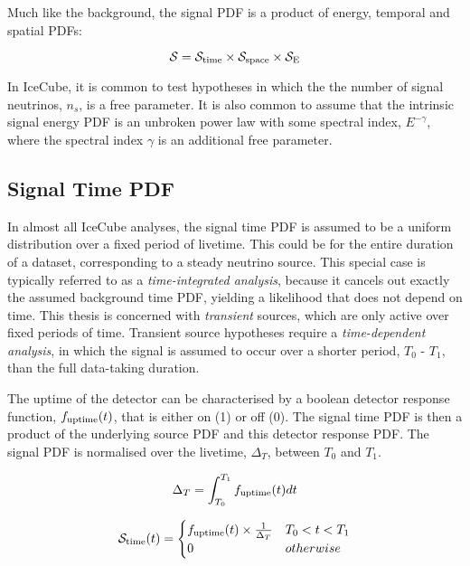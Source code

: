 Much like the background, the signal PDF is a product of energy, temporal and spatial PDFs:

\begin{equation}
\mathcal{S} =  \mathcal{S}_{\textup{time}} \times  \mathcal{S}_{\textup{space}} \times\mathcal{S}_{\textup{E}}
\end{equation}

In IceCube, it is common to test hypotheses in which the the number of signal neutrinos, $n_{s}$, is a free parameter. It is also common to assume that the intrinsic signal energy PDF is an unbroken power law with some spectral index, $E^{-\gamma}$, where the spectral index $\gamma$ is an additional free parameter. 

\subsection*{Signal Time PDF}

In almost all IceCube analyses, the signal time PDF is assumed to be a uniform distribution over a fixed period of livetime. This could be for the entire duration of a dataset, corresponding to a steady neutrino source. This special case is typically referred to as a \emph{time-integrated analysis}, because it cancels out exactly the assumed background time PDF, yielding a likelihood that does not depend on time. This thesis is concerned with \emph{transient} sources, which are only active over fixed periods of time.  Transient source hypotheses require a \emph{time-dependent analysis}, in which the signal is assumed to occur over a shorter period, $T_{0}$ - $T_{1}$, than the full data-taking duration.

The uptime of the detector can be characterised by a boolean detector response function, $f_{\textup{uptime}}(t)$, that is either on (1) or off (0). The signal time PDF is then a product of the underlying source PDF and this detector response PDF. The signal PDF is normalised over the livetime, $\Delta_{T}$, between $T_{0}$ and $T_{1}$.

\begin{equation}
\Delta_{T} = \int_{T_{0}}^{T_{1}}f_{\textup{uptime}}(t) dt
\end{equation}

\begin{equation}
\mathcal{S}_{\textup{time}} (t)= 
\begin{cases}
	f_{\textup{uptime}}(t) \times \frac{1}{\Delta_{T}} & T_{0} < t < T_{1}\\
	0 & otherwise\\
\end{cases}
\end{equation}

